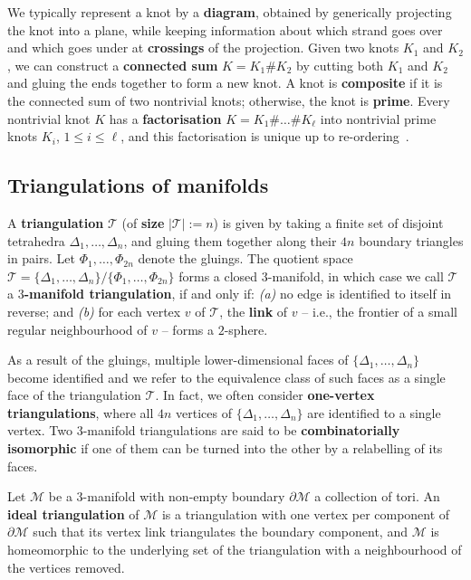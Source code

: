 \documentclass[10pt,a4paper]{amsart}
\newcommand{\tri}{\mathcal{T}}
\newcommand{\manifold}{\mathcal{M}}
\begin{document}
We typically represent a knot by a \textbf{diagram}, obtained by generically projecting the knot into a plane,
while keeping information about which strand goes over and which goes under at \textbf{crossings} of the projection.
Given two knots $K_1$ and $K_2$, we can construct a \textbf{connected sum} $K= K_1 \# K_2$ by cutting both $K_1$ and $K_2$ and gluing the ends together to form a new knot.
A knot is \textbf{composite} if it is the connected sum of two nontrivial knots;
otherwise, the knot is \textbf{prime}.
Every nontrivial knot $K$ has a \textbf{factorisation} $K = K_1 \# \ldots \# K_\ell$ into
nontrivial prime knots $K_i$, $1\leqslant i \leqslant \ell$, and this factorisation is unique up to re-ordering~\cite{schubert49unique}.

\subsection{Triangulations of manifolds}\label{ssec:triangulations}

A \textbf{triangulation} $\tri$ (of \textbf{size} $|\tri|:=n$) is given by taking a finite set of disjoint tetrahedra $\Delta_1, \ldots , \Delta_n$, and gluing them
together along their $4n$ boundary triangles in pairs.
Let $\Phi_1 , \ldots , \Phi_{2n}$ denote the gluings. The quotient space
$\tri = \{\Delta_1, \ldots , \Delta_n\} / \{\Phi_1 , \ldots , \Phi_{2n}\}$
forms a closed $3$-manifold, in which case we call $\tri$ a \textbf{$3$-manifold triangulation}, if and only if: \emph{(a)} no edge is identified to itself in reverse;
and \emph{(b)} for each vertex $v$ of $\tri$, the \textbf{link} of $v$ -- i.e.,
the frontier of a small regular neighbourhood of $v$ -- forms a $2$-sphere.

As a result of the gluings, multiple lower-dimensional faces of  $\{\Delta_1, \ldots , \Delta_n\}$ become identified and we refer to the equivalence class of such faces as a single face of the triangulation $\tri$.
In fact, we often consider \textbf{one-vertex triangulations}, where all $4n$ vertices of $\{\Delta_1, \ldots , \Delta_n\}$ are identified to a single vertex. Two $3$-manifold triangulations are said to be {\bf combinatorially isomorphic} if one of them can be turned into the other by a relabelling of its faces.

Let $\manifold$ be a $3$-manifold with non-empty boundary $\partial \manifold$ a collection of tori. An {\bf ideal triangulation} of $\manifold$ is a triangulation with one vertex per component of $\partial \manifold$ such that its vertex link triangulates the boundary component, and $\manifold $ is homeomorphic to the underlying set of the triangulation with a neighbourhood of the vertices removed.
\end{document}
